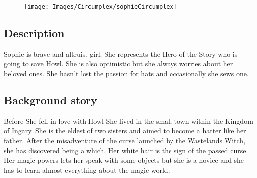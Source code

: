 \begin{figure}
    \centering
  \vspace*{5\baselineskip}
  \texttt{[image: Images/Circumplex/sophieCircumplex]}
  \end{figure}

\subsection{Description}
Sophie is brave and altruist girl. She represents the Hero of the Story who is going to save Howl. She is also optimistic but she always worries about her beloved ones. She hasn’t lost the passion for hats and occasionally she sews one.

\subsection{Background story}
Before She fell in love with Howl She lived in the small town within the Kingdom of Ingary. She is the eldest of two sisters and aimed to become a hatter like her father. After the misadventure of the curse launched by the Wastelands Witch, she has discovered being a which. Her white hair is the sign of the passed curse. Her magic powers lets her speak with some objects but she is a novice and she has to learn almost everything about the magic world.

